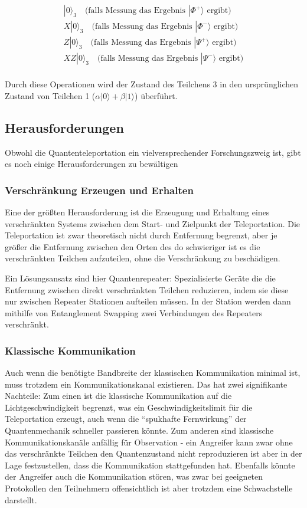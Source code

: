 \begin{gather*}
    |0\rangle_3 \quad \text{(falls Messung das Ergebnis } |\Phi^+\rangle\text{ ergibt)}\\
    X|0\rangle_3 \quad \text{(falls Messung das Ergebnis } |\Phi^-\rangle\text{ ergibt)}\\
    Z|0\rangle_3 \quad \text{(falls Messung das Ergebnis } |\Psi^+\rangle\text{ ergibt)}\\
    XZ|0\rangle_3 \quad \text{(falls Messung das Ergebnis } |\Psi^-\rangle\text{ ergibt)}\\
\end{gather*}

Durch diese Operationen wird der Zustand des Teilchens 3 in den ursprünglichen Zustand von Teilchen 1 (\( \alpha |0\rangle + \beta |1\rangle \)) überführt.


\subsection{Herausforderungen}\label{subsec:challenges}
Obwohl die Quantenteleportation ein vielversprechender Forschungszweig ist, gibt es noch einige Herausforderungen zu bewältigen

\subsubsection{Verschränkung Erzeugen und Erhalten}
Eine der größten Herausforderung ist die Erzeugung und Erhaltung eines verschränkten Systems zwischen dem Start- und Zielpunkt
der Teleportation.
Die Teleportation ist zwar theoretisch nicht durch Entfernung begrenzt, aber je größer die Entfernung zwischen den Orten
des do schwieriger ist es die verschränkten Teilchen aufzuteilen, ohne die Verschränkung zu beschädigen.

Ein Lösungsansatz sind hier Quantenrepeater: Spezialisierte Geräte die die Entfernung zwischen direkt verschränkten Teilchen reduzieren,
indem sie diese nur zwischen Repeater Stationen aufteilen müssen.
In der Station werden dann mithilfe von Entanglement Swapping zwei Verbindungen des Repeaters verschränkt.

\subsubsection{Klassische Kommunikation}
Auch wenn die benötigte Bandbreite der klassischen Kommunikation minimal ist, muss trotzdem ein Kommunikationskanal
existieren.
Das hat zwei signifikante Nachteile: Zum einen ist die klassische Kommunikation auf die Lichtgeschwindigkeit begrenzt,
was ein Geschwindigkeitslimit für die Teleportation erzeugt, auch wenn die ``spukhafte Fernwirkung'' der Quantenmechanik
schneller passieren könnte\cite{hensen2015loophole}.
Zum anderen sind klassische Kommunikationskanäle anfällig für Observation - ein Angreifer kann zwar
ohne das verschränkte Teilchen den Quantenzustand nicht reproduzieren ist aber in der Lage festzustellen, dass die
Kommunikation stattgefunden hat.
Ebenfalls könnte der Angreifer auch die Kommunikation stören, was zwar bei geeigneten Protokollen den Teilnehmern
offensichtlich ist aber trotzdem eine Schwachstelle darstellt.

